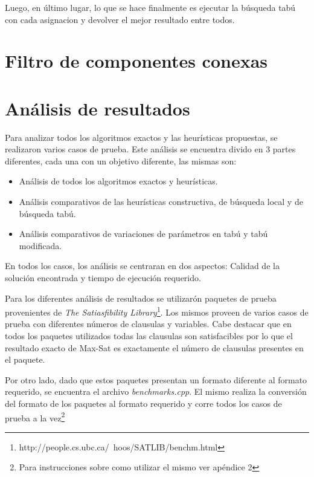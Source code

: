 \documentclass[a4paper,10pt]{article}
\begin{document}
Luego, en \'ultimo lugar, lo que se hace finalmente es ejecutar la b\'usqueda tab\'u con cada asignacion y devolver el mejor resultado entre todos.


\section*{Filtro de componentes conexas}


\section*{An\'alisis de resultados}


Para analizar todos los algoritmos exactos y las heur\'isticas propuestas, se realizaron varios casos de prueba. Este an\'alisis se encuentra divido en 3 partes diferentes, cada una con un objetivo diferente, las mismas son:

\begin{itemize}
\item An\'alisis de todos los algoritmos exactos y heur\'isticas.
\item An\'alisis comparativos de las heur\'isticas constructiva, de b\'usqueda local y de b\'usqueda tab\'u.
\item An\'alisis comparativos de variaciones de par\'ametros en tab\'u y tab\'u modificada.
\end{itemize}
 

En todos los casos, los an\'alisis se centraran en dos aspectos: Calidad de la soluci\'on encontrada y tiempo de ejecuci\'on requerido.

Para los diferentes an\'alisis de resultados se utilizar\'on paquetes de prueba provenientes de \emph{The Satiasfibility Library}\footnote{http://people.cs.ubc.ca/~hoos/SATLIB/benchm.html}. Los mismos proveen de varios casos de prueba con diferentes n\'umeros de clausulas y variables. Cabe destacar que en todos los paquetes utilizados todas las clausulas son satisfacibles por lo que el resultado exacto de Max-Sat es exactamente el n\'umero de clausulas presentes en el paquete.

Por otro lado, dado que estos paquetes presentan un formato diferente al formato requerido, se encuentra el archivo \emph{benchmarks.cpp}. El mismo realiza la conversi\'on del formato de los paquetes al formato requerido y corre todos los casos de prueba a la vez\footnote{Para instrucciones sobre como utilizar el mismo ver ap\'endice 2}
\end{document}
